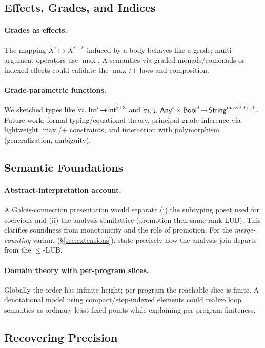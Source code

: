 \subsection{Effects, Grades, and Indices}
\paragraph{Grades as effects.}
The mapping $X^{i}\mapsto X^{i+k}$ induced by a body behaves like a grade; multi-argument operators use $\max$. A semantics via graded monads/comonads or indexed effects could validate the $\max$/$+$ laws and composition.

\paragraph{Grade-parametric functions.}
We sketched types like $\forall i.\ \Int^i\!\to\!\Int^{i+3}$ and $\forall i,j.\ \mathsf{Any}^i\times\mathsf{Bool}^j\!\to\!\mathsf{String}^{\max(i,j)+1}$. Future work: formal typing/equational theory, principal-grade inference via lightweight $\max$/$+$ constraints, and interaction with polymorphism (generalization, ambiguity).

\subsection{Semantic Foundations}
\paragraph{Abstract-interpretation account.}
A Galois-connection presentation would separate (i) the subtyping poset used for coercions and (ii) the analysis semilattice (promotion then same-rank LUB). This clarifies soundness from monotonicity and the role of promotion. For the \emph{merge-counting} variant (\S\ref{sec:extensions}), state precisely how the analysis join departs from the $\le$-LUB.

\paragraph{Domain theory with per-program slices.}
Globally the order has infinite height; per program the reachable slice is finite. A denotational model using compact/step-indexed elements could realize loop semantics as ordinary least fixed points while explaining per-program finiteness.

\subsection{Recovering Precision}
